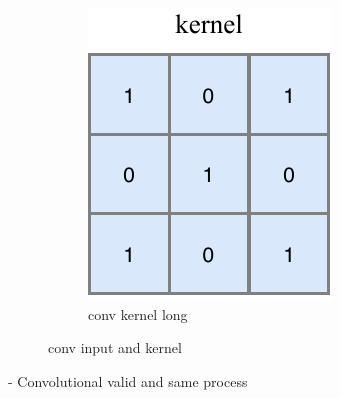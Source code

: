 \begin{figure}
\begin{subfigure}[b]{0.4\textwidth}
        \includegraphics[width=\textwidth]{diagrams/6-cvn/conv_kernel.pdf}
        \caption{conv kernel long}
        \label{fig:conv_kernel}
    \end{subfigure}
    \caption{conv input and kernel}
    \label{fig:conv_input_kernel}
\end{figure}
- Convolutional valid and same process
